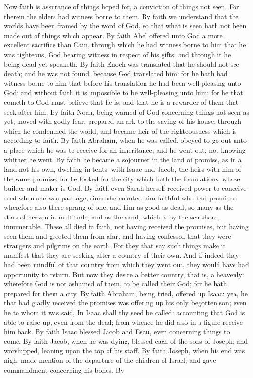 Now faith is assurance of things hoped for, a conviction of things not seen. For therein the elders had witness borne to them. By faith we understand that the worlds have been framed by the word of God, so that what is seen hath not been made out of things which appear. By faith Abel offered unto God a more excellent sacrifice than Cain, through which he had witness borne to him that he was righteous, God bearing witness in respect of his gifts: and through it he being dead yet speaketh. By faith Enoch was translated that he should not see death; and he was not found, because God translated him: for he hath had witness borne to him that before his translation he had been well-pleasing unto God: and without faith it is impossible to be well-pleasing unto him; for he that cometh to God must believe that he is, and that he is a rewarder of them that seek after him. By faith Noah, being warned of God concerning things not seen as yet, moved with godly fear, prepared an ark to the saving of his house; through which he condemned the world, and became heir of the righteousness which is according to faith. By faith Abraham, when he was called, obeyed to go out unto a place which he was to receive for an inheritance; and he went out, not knowing whither he went. By faith he became a sojourner in the land of promise, as in a land not his own, dwelling in tents, with Isaac and Jacob, the heirs with him of the same promise: for he looked for the city which hath the foundations, whose builder and maker is God. By faith even Sarah herself received power to conceive seed when she was past age, since she counted him faithful who had promised: wherefore also there sprang of one, and him as good as dead, so many as the stars of heaven in multitude, and as the sand, which is by the sea-shore, innumerable.  These all died in faith, not having received the promises, but having seen them and greeted them from afar, and having confessed that they were strangers and pilgrims on the earth. For they that say such things make it manifest that they are seeking after a country of their own. And if indeed they had been mindful of that country from which they went out, they would have had opportunity to return. But now they desire a better country, that is, a heavenly: wherefore God is not ashamed of them, to be called their God; for he hath prepared for them a city.  By faith Abraham, being tried, offered up Isaac: yea, he that had gladly received the promises was offering up his only begotten son; even he to whom it was said, In Isaac shall thy seed be called: accounting that God is able to raise up, even from the dead; from whence he did also in a figure receive him back. By faith Isaac blessed Jacob and Esau, even concerning things to come. By faith Jacob, when he was dying, blessed each of the sons of Joseph; and worshipped, leaning upon the top of his staff. By faith Joseph, when his end was nigh, made mention of the departure of the children of Israel; and gave commandment concerning his bones. By 